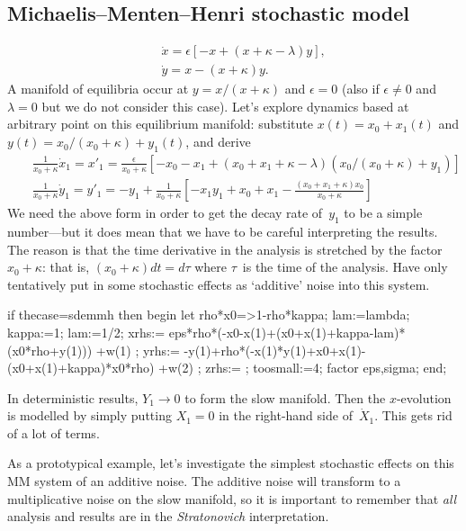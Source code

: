\documentclass[11pt,a5paper]{article}
\begin{document}
\subsection{Michaelis--Menten--Henri stochastic model}
\def\b#1{\color{blue}{}#1\color{black}{}}
\def\spt{\textsc{spt}}
\def\dash#1{#1'}%


\begin{eqnarray*}
&&\dot x=\epsilon[-x+(x+\kappa-\lambda)y],
\\&&\dot y=x-(x+\kappa)y.
\end{eqnarray*}
A manifold of equilibria occur at \(y=x/(x+\kappa)\) and \(\epsilon=0\)  (also if \(\epsilon\neq 0\) and \(\lambda=0\) but we do not consider this case).
Let's explore dynamics based at arbitrary point on this equilibrium manifold:
substitute \(x(t)=x_0+x_1(t)\) and \(y(t)=x_0/(x_0+\kappa)+y_1(t)\), and derive
\begin{eqnarray*}
&&\frac1{x_0+\kappa}\dot x_1=x'_1=\frac\epsilon{x_0+\kappa}\left[
-x_0-x_1+(x_0+x_1+\kappa-\lambda)(x_0/(x_0+\kappa)+y_1)
\right]
\\&&\frac1{x_0+\kappa}\dot y_1=y'_1=-y_1+\frac1{x_0+\kappa}\left[
-x_1y_1+x_0+x_1-\frac{(x_0+x_1+\kappa)x_0}{x_0+\kappa}\right]
\end{eqnarray*}
We need the above form in order to get the decay rate of~\(y_1\) to be a simple number---but it does mean that we have to be careful interpreting the results.
The reason is that the time derivative in the analysis is stretched by the factor~\(x_0+\kappa\): that is, \((x_0+\kappa)dt=d\tau\) where \(\tau\)~is the time of the analysis.
Have only tentatively put in some stochastic effects as `additive' noise into this system.
\begin{reduce}
if thecase=sdemmh then begin
let rho*x0=>1-rho*kappa;
lam:=lambda;
kappa:=1; lam:=1/2; %
xrhs:={ eps*rho*(-x0-x(1)+(x0+x(1)+kappa-lam)*(x0*rho+y(1)))
    +w(1) };
yrhs:={ -y(1)+rho*(-x(1)*y(1)+x0+x(1)-(x0+x(1)+kappa)*x0*rho)
    +w(2) };
zrhs:={ };
toosmall:=4;
factor eps,sigma;
end;
\end{reduce}

In deterministic results, \(Y_1\to 0\) to form the slow manifold.
Then the \(x\)-evolution is modelled by simply putting \(X_1=0\) in the right-hand side of~\(\dot X_1\).
This gets rid of a lot of terms. 

As a prototypical example, let's investigate the simplest
stochastic effects on this MM system of an additive noise. The
additive noise will transform to a multiplicative noise on
the slow manifold, so it is important to remember that
\emph{all} analysis and results are in the
\emph{Stratonovich} interpretation.
\end{document}
